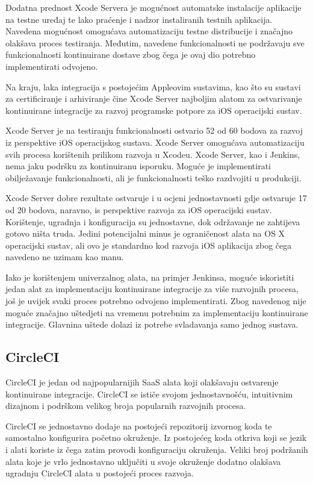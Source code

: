 \documentclass[times, utf8, diplomski, numeric]{fer}
\begin{document}
\begin{appendices}
Dodatna prednost Xcode Servera je mogućnost automatske instalacije aplikacije na testne uređaj te lako praćenje i nadzor instaliranih testnih aplikacija. Navedena mogućnost omogućava automatizaciju testne distribucije i značajno olakšava proces testiranja. Međutim, navedene funkcionalnosti ne podržavaju sve funkcionalnosti kontinuirane dostave zbog čega je ovaj dio potrebno implementirati odvojeno.

Na kraju, laka integracija s postojećim Appleovim sustavima, kao što su sustavi za certificiranje i arhiviranje čine Xcode Server najboljim alatom za ostvarivanje kontinuirane integracije za razvoj programske potpore za iOS operacijski sustav.

Xcode Server je na testiranju funkcionalnosti ostvario 52 od 60 bodova za razvoj iz perspektive iOS operacijskog sustava. Xcode Server omogućava automatizaciju svih procesa korištenih prilikom razvoja u Xcodeu. Xcode Server, kao i Jenkins, nema jaku podršku za kontinuiranu isporuku. Moguće je implementirati obilježavanje funkcionalnosti, ali je funkcionalnosti teško razdvojiti u produkciji.

Xcode Server dobre rezultate ostvaruje i u ocjeni jednostavnosti gdje ostvaruje 17 od 20 bodova, naravno, is perspektive razvoja za iOS operacijski sustav. Korištenje, ugradnja i konfiguracija su jednostavne, dok održavanje ne zahtijeva gotovo ništa truda. Jedini potencijalni minus je ograničenost alata na OS X operacijski sustav, ali ovo je standardno kod razvoja iOS aplikacija zbog čega navedeno ne uzimam kao manu.

Iako je korištenjem univerzalnog alata, na primjer Jenkinsa, moguće iskoristiti jedan alat za implementaciju kontinuirane integracije za više razvojnih procesa, još je uvijek svaki proces potrebno odvojeno implementirati. Zbog navedenog nije moguće značajno uštedjeti na vremenu potrebnim za implementaciju kontinuirane integracije. Glavnina uštede dolazi iz potrebe svladavanja samo jednog sustava.

\subsection{CircleCI}
CircleCI je jedan od najpopularnijih SaaS alata koji olakšavaju ostvarenje kontinuirane integracije. CircleCI se ističe svojom jednostavnošću, intuitivnim dizajnom i podrškom velikog broja popularnih razvojnih procesa.

CircleCI se jednostavno dodaje na postojeći repozitorij izvornog koda te samostalno konfigurira početno okruženje. Iz postojećeg koda otkriva koji se jezik i alati koriste iz čega zatim provodi konfiguraciju okruženja. Veliki broj podržanih alata koje je vrlo jednostavno uključiti u svoje okruženje dodatno olakšava ugradnju CircleCI alata u postojeći proces razvoja.


\end{appendices}
\end{document}
